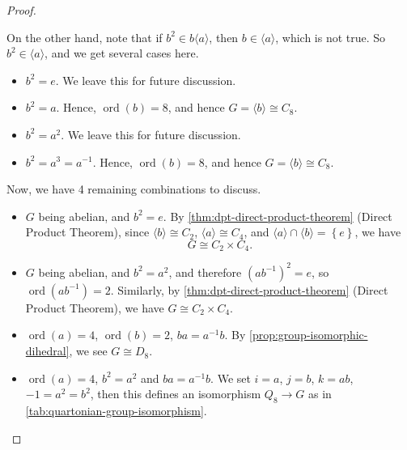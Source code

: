 \documentclass{article}
\theoremstyle{definition}
\theoremstyle{remark}
\newcommand{\pqty}[1]{\left(#1\right)}
\newcommand{\Bqty}[1]{\left\{#1\right\}}
\newcommand{\angBrac}[1]{\langle #1\rangle}
\newcommand{\inverse}{^{-1}}
\newcommand{\isomorphic}{\cong}
\newcommand{\ord}{\operatorname{ord}}
\begin{document}
\begin{proof}
\begin{itemize}
        On the other hand, note that if \(b^2 \in b \angBrac{a}\), then \(b \in \angBrac{a}\), which is not true. So \(b^2 \in \angBrac{a}\), and we get several cases here.
        \begin{itemize}
            \item \(b^2 = e\). We leave this for future discussion.
            \item \(b^2 = a\). Hence, \(\ord\pqty{b} = 8\), and hence \(G = \angBrac{b} \isomorphic C_8\).
            \item \(b^2 = a^2\). We leave this for future discussion.
            \item \(b^2 = a^3 = a\inverse\). Hence, \(\ord\pqty{b} = 8\), and hence \(G = \angBrac{b} \isomorphic C_8\).
        \end{itemize}

        Now, we have 4 remaining combinations to discuss.
        \begin{itemize}
            \item \(G\) being abelian, and \(b^2 = e\). By \autoref{thm:dpt-direct-product-theorem} (Direct Product Theorem), since \(\angBrac{b} \isomorphic C_2\), \(\angBrac{a} \isomorphic C_4\), and \(\angBrac{a} \cap \angBrac{b} = \Bqty{e}\), we have
            \[
                G \isomorphic C_2 \times C_4.
            \]
            \item \(G\) being abelian, and \(b^2 = a^2\), and therefore \(\pqty{a b \inverse}^2 = e\), so \(\ord \pqty{a b \inverse} = 2\). Similarly, by \autoref{thm:dpt-direct-product-theorem} (Direct Product Theorem), we have \(G \isomorphic C_2 \times C_4\).
            \item \(\ord\pqty{a} = 4\), \(\ord\pqty{b} = 2\), \(ba = a\inverse b\). By \autoref{prop:group-isomorphic-dihedral}, we see \(G \isomorphic D_8\).
            \item \(\ord\pqty{a} = 4\), \(b^2 = a^2\) and \(b a = a \inverse b\). We set \(i = a\), \(j = b\), \(k = ab\), \(-1 = a^2 = b^2\), then this defines an isomorphism \(Q_8 \to G\) as in \autoref{tab:quartonian-group-isomorphism}.


\end{itemize}
\end{itemize}
\end{proof}
\end{document}
